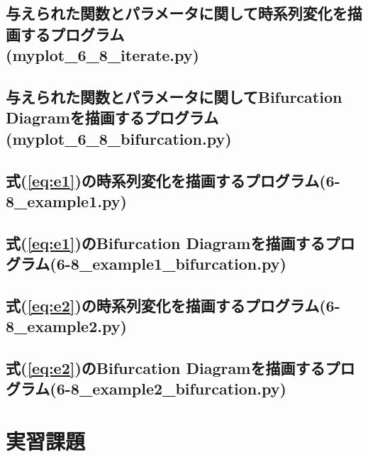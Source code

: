 \documentclass{jsarticle}
\begin{document}
		\subsection{与えられた関数とパラメータに関して時系列変化を描画するプログラム \\ (myplot\_6\_8\_iterate.py)}
		
		\subsection{与えられた関数とパラメータに関してBifurcation Diagramを描画するプログラム(myplot\_6\_8\_bifurcation.py)}
		
		\subsection{式(\ref{eq:e1})の時系列変化を描画するプログラム(6-8\_example1.py)}
		
		\subsection{式(\ref{eq:e1})のBifurcation Diagramを描画するプログラム(6-8\_example1\_bifurcation.py)}
		
		\subsection{式(\ref{eq:e2})の時系列変化を描画するプログラム(6-8\_example2.py)}

		\subsection{式(\ref{eq:e2})のBifurcation Diagramを描画するプログラム(6-8\_example2\_bifurcation.py)}

	
	\section{実習課題}
	
\end{document}
